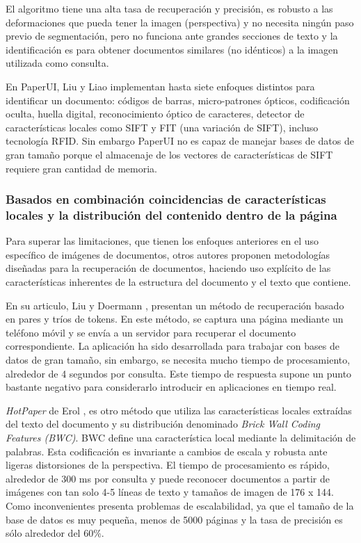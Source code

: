 El algoritmo tiene una alta tasa de recuperación y precisión, es robusto a las deformaciones que pueda tener la imagen (perspectiva) y no necesita ningún paso previo de segmentación, pero no funciona ante grandes secciones de texto y la identificación es para obtener documentos similares (no idénticos) a la imagen utilizada como consulta.

En PaperUI, Liu y Liao \cite{LiuLiao} implementan hasta siete enfoques distintos para identificar un documento: códigos de barras, micro-patrones ópticos, codificación oculta, huella digital, reconocimiento óptico de caracteres, detector de características locales como SIFT y FIT (una variación de SIFT), incluso tecnología RFID. Sin embargo PaperUI no es capaz de manejar bases de datos de gran tamaño porque el almacenaje de los vectores de características de SIFT requiere gran cantidad de memoria. 


\subsubsection{Basados en combinación coincidencias de características locales y la distribución del contenido dentro de la página}
Para superar las limitaciones, que tienen los enfoques anteriores en el uso específico de imágenes de documentos, otros autores proponen metodologías diseñadas para la recuperación de documentos, haciendo uso explícito de las características inherentes de la estructura del documento y el texto que contiene.

En su articulo, Liu y Doermann \cite{Liu}, presentan un método de recuperación basado en pares y tríos de tokens. En este método, se captura una página mediante un teléfono móvil y se envía a un servidor para recuperar el documento correspondiente. La aplicación ha sido desarrollada para trabajar con bases de datos de gran tamaño, sin embargo, se necesita mucho tiempo de procesamiento, alrededor de 4 segundos por consulta. Este tiempo de respuesta  supone un punto bastante negativo para considerarlo introducir en aplicaciones en tiempo real.

\emph{HotPaper} de Erol \cite{Erol}, es otro método que utiliza las características locales extraídas del texto del documento y su distribución denominado \emph{Brick Wall Coding Features (BWC)}. BWC define una característica local mediante la delimitación de palabras. Esta codificación es invariante a cambios de escala y robusta ante ligeras distorsiones de la perspectiva. El tiempo de procesamiento es rápido, alrededor de 300 ms por consulta y puede reconocer documentos a partir de imágenes con tan solo 4-5 líneas de texto y tamaños de imagen de 176 x 144. Como inconvenientes presenta problemas de escalabilidad, ya que el tamaño de la base de datos es muy pequeña, menos de 5000 páginas y la tasa de precisión es sólo alrededor del 60\%. 


